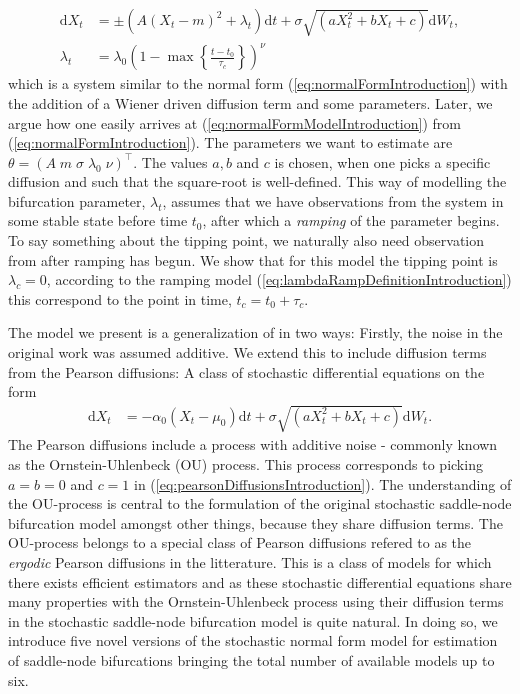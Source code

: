 \begin{align}
    \mathrm{d}X_t &= \pm(A(X_t - m)^2 + \lambda_t)\mathrm{d}t + \sigma\sqrt{\left(aX_t^2 + bX_t + c\right)}\mathrm{d}W_t, \label{eq:normalFormModelIntroduction}\\
    \lambda_t &= \lambda_0\left(1 - \max\left\{\frac{t - t_0}{\tau_c}\right\}\right)^\nu \label{eq:lambdaRampDefinitionIntroduction}
\end{align}
which is a system similar to the normal form (\ref{eq:normalFormIntroduction}) with the addition of a Wiener driven diffusion term and some parameters. Later, we argue how one easily arrives at (\ref{eq:normalFormModelIntroduction}) from (\ref{eq:normalFormIntroduction}). The parameters we want to estimate are $\theta = \left(A\; m\; \sigma\; \lambda_0\; \nu\right)^\top$. The values $a, b$ and $c$ is chosen, when one picks a specific diffusion and such that the square-root is well-defined. This way of modelling the bifurcation parameter, $\lambda_t$, assumes that we have observations from the system in some stable state before time $t_0$, after which a \textit{ramping} of the parameter begins. To say something about the tipping point, we naturally also need observation from after ramping has begun. We show that for this model the tipping point is $\lambda_c = 0$, according to the ramping model (\ref{eq:lambdaRampDefinitionIntroduction}) this correspond to the point in time, $t_c = t_0 + \tau_c$.

The model we present is a generalization of \cite[equation (1)]{Ditlevsen2023} in two ways: Firstly, the noise in the original work was assumed additive. We extend this to include diffusion terms from the Pearson diffusions: A class of stochastic differential equations on the form
\begin{align}
    \mathrm{d}X_t &= -\alpha_0\left(X_t - \mu_0\right)\mathrm{d}t + \sigma\sqrt{\left(aX_t^2 + bX_t + c\right)}\mathrm{d}W_t. \label{eq:pearsonDiffusionsIntroduction}
\end{align}
The Pearson diffusions include a process with additive noise - commonly known as the Ornstein-Uhlenbeck (OU) process. This process corresponds to picking $a = b = 0$ and $c = 1$ in (\ref{eq:pearsonDiffusionsIntroduction}). The understanding of the OU-process is central to the formulation of the original stochastic saddle-node bifurcation model amongst other things, because they share diffusion terms. The OU-process belongs to a special class of Pearson diffusions refered to as the \textit{ergodic} Pearson diffusions in the litterature. This is a class of models for which there exists efficient estimators and as these stochastic differential equations share many properties with the Ornstein-Uhlenbeck process using their diffusion terms in the stochastic saddle-node bifurcation model is quite natural. In doing so, we introduce five novel versions of the stochastic normal form model for estimation of saddle-node bifurcations bringing the total number of available models up to six.

